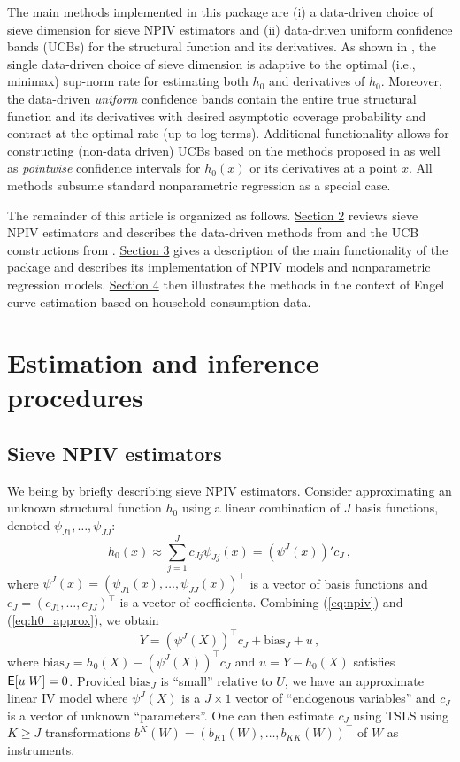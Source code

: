 \documentclass[
]{jss}
\begin{document}
The main methods implemented in this package are (i) a data-driven
choice of sieve dimension for sieve NPIV estimators and (ii) data-driven
uniform confidence bands (UCBs) for the structural function and its
derivatives. As shown in \citet{CCK}, the single data-driven choice of
sieve dimension is adaptive to the optimal (i.e., minimax) sup-norm rate
for estimating both \(h_0\) and derivatives of \(h_0\). Moreover, the
data-driven \emph{uniform} confidence bands contain the entire true
structural function and its derivatives with desired asymptotic coverage
probability and contract at the optimal rate (up to log terms).
Additional functionality allows for constructing (non-data driven) UCBs
based on the methods proposed in \citet{CCQE} as well as
\emph{pointwise} confidence intervals for \(h_0(x)\) or its derivatives
at a point \(x\). All methods subsume standard nonparametric regression
as a special case.

The remainder of this article is organized as follows.
\protect\hyperlink{method}{Section 2} reviews sieve NPIV estimators and
describes the data-driven methods from \citet{CCK} and the UCB
constructions from \citet{CCQE}. \protect\hyperlink{desc}{Section 3}
gives a description of the main functionality of the package 
and describes its implementation of NPIV models and nonparametric
regression models. \protect\hyperlink{engel}{Section 4} then illustrates
the methods in the context of Engel curve estimation based on household
consumption data.

\hypertarget{method}{%
\section{Estimation and inference procedures}\label{method}}

\hypertarget{sieve-npiv-estimators}{%
\subsection{Sieve NPIV estimators}\label{sieve-npiv-estimators}}

We being by briefly describing sieve NPIV estimators. Consider
approximating an unknown structural function \(h_0\) using a linear
combination of \(J\) basis functions, denoted
\(\psi_{J1},\ldots,\psi_{JJ}\): \begin{equation}\label{eq:h0_approx}
 h_0(x) \approx \sum_{j=1}^J c_{Jj} \psi_{Jj}(x) = (\psi^J(x))'c_J\,,
\end{equation} where
\(\psi^J(x) = (\psi_{J1}(x),\ldots,\psi_{JJ}(x))^\top\) is a vector of
basis functions and \(c_J = (c_{J1},\ldots,c_{JJ})^\top\) is a vector of
coefficients. Combining (\ref{eq:npiv}) and (\ref{eq:h0_approx}), we
obtain \[
 Y = (\psi^J(X))^\top c_J + \mathrm{bias}_J + u\,,
\] where \(\mathrm{bias}_J = h_0(X) - (\psi^J(X))^\top c_J\) and
\(u = Y - h_0(X)\) satisfies \(\mathsf{E}[u|W] = 0\). Provided
\(\mathrm{bias}_J\) is ``small'' relative to \(U\), we have an
approximate linear IV model where \(\psi^J(X)\) is a \(J\times 1\)
vector of ``endogenous variables'' and \(c_J\) is a vector of unknown
``parameters''. One can then estimate \(c_J\) using TSLS using
\(K \geq J\) transformations
\(b^K(W)= (b_{K1}(W),\ldots,b_{KK}(W))^\top\) of \(W\) as instruments.
\end{document}
